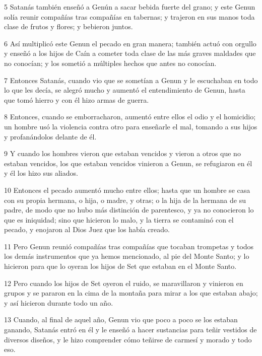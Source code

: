 \par 5 Satanás también enseñó a Genún a sacar bebida fuerte del grano; y este Genun solía reunir compañías tras compañías en tabernas; y trajeron en sus manos toda clase de frutos y flores; y bebieron juntos.

\par 6 Así multiplicó este Genun el pecado en gran manera; también actuó con orgullo y enseñó a los hijos de Caín a cometer toda clase de las más graves maldades que no conocían; y los sometió a múltiples hechos que antes no conocían.

\par 7 Entonces Satanás, cuando vio que se sometían a Genun y le escuchaban en todo lo que les decía, se alegró mucho y aumentó el entendimiento de Genun, hasta que tomó hierro y con él hizo armas de guerra.

\par 8 Entonces, cuando se emborracharon, aumentó entre ellos el odio y el homicidio; un hombre usó la violencia contra otro para enseñarle el mal, tomando a sus hijos y profanándolos delante de él.

\par 9 Y cuando los hombres vieron que estaban vencidos y vieron a otros que no estaban vencidos, los que estaban vencidos vinieron a Genun, se refugiaron en él y él los hizo sus aliados.

\par 10 Entonces el pecado aumentó mucho entre ellos; hasta que un hombre se casa con su propia hermana, o hija, o madre, y otras; o la hija de la hermana de su padre, de modo que no hubo más distinción de parentesco, y ya no conocieron lo que es iniquidad; sino que hicieron lo malo, y la tierra se contaminó con el pecado, y enojaron al Dios Juez que los había creado.

\par 11 Pero Genun reunió compañías tras compañías que tocaban trompetas y todos los demás instrumentos que ya hemos mencionado, al pie del Monte Santo; y lo hicieron para que lo oyeran los hijos de Set que estaban en el Monte Santo.

\par 12 Pero cuando los hijos de Set oyeron el ruido, se maravillaron y vinieron en grupos y se pararon en la cima de la montaña para mirar a los que estaban abajo; y así hicieron durante todo un año.

\par 13 Cuando, al final de aquel año, Genun vio que poco a poco se los estaban ganando, Satanás entró en él y le enseñó a hacer sustancias para teñir vestidos de diversos diseños, y le hizo comprender cómo teñirse de carmesí y morado y todo eso.

